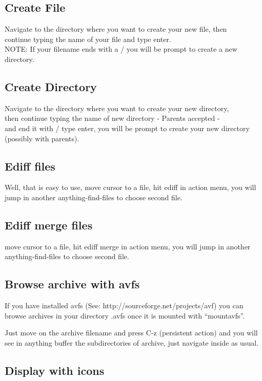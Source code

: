 \documentclass[a4paper,11pt]{article}
\begin{document}
\subsection{Create File}
\label{sec:create-file}
Navigate to the directory where you want to create your new file, then \\
continue typing the name of your file and type enter. \\
NOTE: If your filename ends with a / you will be prompt to create a new directory.

\subsection{Create Directory}
\label{sec:create-directory}
Navigate to the directory where you want to create your new directory, \\
then continue typing the name of new directory - Parents accepted - \\
and end it with / type enter, you will be prompt to create your new directory (possibly with parents).

\subsection{Ediff files}
\label{sec:ediff-files}
Well, that is easy to use, 
move cursor to a file, hit ediff in action menu, you will jump in
another anything-find-files to choose second file.
\subsection{Ediff merge files}
\label{sec:ediff-merge-files}
move cursor to a file, hit ediff merge in action menu, you will jump in
another anything-find-files to choose second file.

\subsection{Browse archive with avfs}
\label{sec:browse-archive-with}

If you have installed avfs (See: http://sourceforge.net/projects/avf) you can browse archives
in your directory .avfs once it is mounted with ``mountavfs''.

Just move on the archive filename and press C-z (persistent action) and you will see
in anything buffer the subdirectories of archive, just navigate inside as usual.

\subsection{Display with icons}
\label{sec:display-with-icons}
\end{document}
